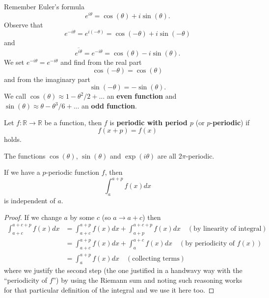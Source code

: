 
Remember Euler's formula
\begin{equation}
e^{i\theta} = \cos(\theta)+i\sin(\theta).
\end{equation}
Observe that
\begin{equation}
e^{-i\theta}=e^{i(-\theta)} = \cos(-\theta)+i\sin(-\theta)
\end{equation}
and
\begin{equation}
\overline{e^{i\theta}}=e^{-i\theta} =
\cos(\theta)-i\sin(\theta).
\end{equation}
We set $e^{-i\theta}=e^{-i\theta}$ and find from the real
part
\begin{equation}
\cos(-\theta)=\cos(\theta)
\end{equation}
and from the imaginary part
\begin{equation}
\sin(-\theta)=-\sin(\theta).
\end{equation}
We call $\cos(\theta)\approx 1-\theta^2/2+...$ an \textbf{even function} and
$\sin(\theta)\approx \theta-\theta^3/6+...$ an \textbf{odd function}. 

\begin{defn}
Let $f:\mathbb{R}\to\mathbb{R}$ be a function, then $f$ is
\textbf{periodic with period $p$} (or $p$-\textbf{periodic})
if
\begin{equation}
f(x+p)=f(x)
\end{equation}
holds.
\end{defn}

\begin{ex}
The functions $\cos(\theta)$, $\sin(\theta)$ and
$\exp(i\theta)$ are all $2\pi$-periodic.
\end{ex}

\begin{lem}
If we have a $p$-periodic function $f$, then
\begin{equation}
\int^{a+p}_{a}f(x)dx
\end{equation}
is independent of $a$.
\end{lem}
\begin{proof}
If we change $a$ by some $c$ (so $a\to a+c$) then
\begin{subequations}
\begin{align}
\int^{a+c+p}_{a+c}f(x)dx &= \int^{a+p}_{a+c}f(x)dx +
\int^{a+c+p}_{a+p}f(x)dx\quad(\text{by linearity of integral})\\
&= \int^{a+p}_{a+c}f(x)dx +
\int^{a+c}_{a}f(x)dx\quad(\text{by periodicity of $f(x)$}) \\
&= \int^{a+p}_{a}f(x)dx\quad(\text{collecting terms})
\end{align}
\end{subequations}
where we justify the second step (the one justified in a
handwavy way with the ``periodicity of $f$'') by using the
Riemann sum and noting such reasoning works for that
particular definition of the integral and we use it here too.
\end{proof}

